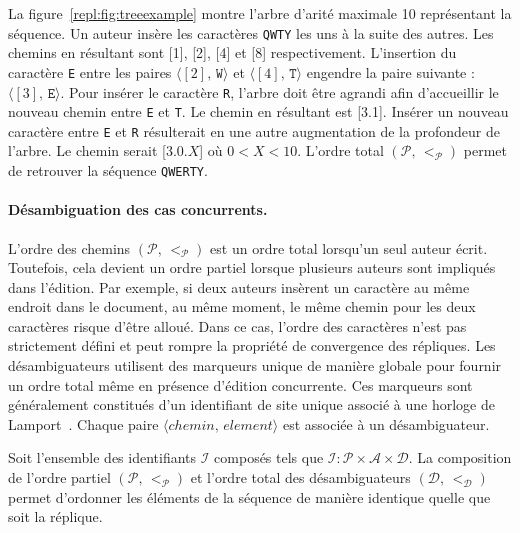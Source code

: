 La figure~\ref{repl:fig:treeexample} montre l'arbre d'arité maximale 10
représentant la séquence. Un auteur insère les caractères \texttt{QWTY} les uns
à la suite des autres. Les chemins en résultant sont [1], [2], [4] et [8]
respectivement. L'insertion du caractère \texttt{E} entre les paires
$\langle [2],\, \texttt{W} \rangle$ et $\langle [4],\, \texttt{T} \rangle$
engendre la paire suivante : $\langle [3],\, \texttt{E} \rangle$. Pour insérer
le caractère \texttt{R}, l'arbre doit être agrandi afin d'accueillir le nouveau
chemin entre \texttt{E} et \texttt{T}. Le chemin en résultant est [3.1]. Insérer
un nouveau caractère entre \texttt{E} et \texttt{R} résulterait en une autre
augmentation de la profondeur de l'arbre. Le chemin serait [3.0.$X$] où
$0<X<10$. L'ordre total $(\mathcal{P},\, <_\mathcal{P})$ permet de retrouver la
séquence \texttt{QWERTY}.


\paragraph{Désambiguation des cas concurrents.}

L'ordre des chemins $(\mathcal{P},\, <_\mathcal{P})$ est un ordre total
lorsqu'un seul auteur écrit. Toutefois, cela devient un ordre partiel lorsque
plusieurs auteurs sont impliqués dans l'édition. Par exemple, si deux auteurs
insèrent un caractère au même endroit dans le document, au même moment, le même
chemin pour les deux caractères risque d'être alloué. Dans ce cas, l'ordre des
caractères n'est pas strictement défini et peut rompre la propriété de
convergence des répliques. Les désambiguateurs utilisent des marqueurs unique de
manière globale pour fournir un ordre total même en présence d'édition
concurrente. Ces marqueurs sont généralement constitués d'un identifiant de site
unique associé à une horloge de Lamport~\cite{lamport1978time}. Chaque paire
$\langle chemin,\, element \rangle$ est associée à un désambiguateur.

Soit l'ensemble des identifiants $\mathcal{I}$ composés tels que
$\mathcal{I} : \mathcal{P} \times \mathcal{A} \times \mathcal{D}$. La
composition de l'ordre partiel $(\mathcal{P},\,<_\mathcal{P})$ et l'ordre total
des désambiguateurs $(\mathcal{D},\, <_\mathcal{D})$ permet d'ordonner les
éléments de la séquence de manière identique quelle que soit la réplique.

